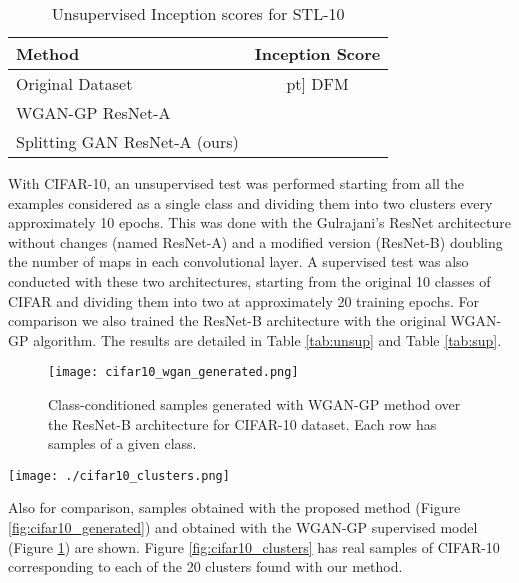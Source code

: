 \documentclass[times,twocolumn]{article}
\begin{document}
\begin{table}
\begin{center}
\caption{Unsupervised Inception scores for STL-10}
\begin{tabular}{lc}
\toprule
Method                                   &   Inception Score \\
\midrule
Original Dataset \cite{WardeFarley2017}  &   \5pt]
DFM \cite{WardeFarley2017}               &   \\
WGAN-GP ResNet-A                         &   \\
Splitting GAN ResNet-A (ours)            &   \\
\bottomrule
\end{tabular}
\end{center}
\label{tab:sup_stl10}
\end{table}

With CIFAR-10, an unsupervised test was performed starting from all the examples considered as a single class and dividing them into two clusters every approximately 10 epochs.  This was done with the Gulrajani's ResNet architecture without changes (named ResNet-A) and a modified version (ResNet-B) doubling the number of maps in each convolutional layer. A supervised test was also conducted with these two architectures, starting from the original 10 classes of CIFAR and dividing them into two at approximately 20 training epochs. For comparison we also trained the ResNet-B architecture with the original WGAN-GP algorithm. The results are detailed in Table \ref{tab:unsup} and Table \ref{tab:sup}. 



\begin{figure}
\centering
\texttt{[image: cifar10\_wgan\_generated.png]}
\caption{Class-conditioned samples generated with WGAN-GP method \cite{Gulrajani2017} over the ResNet-B architecture for CIFAR-10 dataset. Each row has samples of a given class.}
\label{fig:cifar10_wgan_generated}
\end{figure}


\begin{figure*}
 \centering
 \texttt{[image: ./cifar10\_clusters.png]}
 \caption{Real CIFAR-10 samples corresponding to the 20 clusters found by our method. Each line is divided in the same way as in Figure \ref{fig:cifar10_generated}.}
 \label{fig:cifar10_clusters}
\end{figure*}

Also for comparison, samples obtained with the proposed method (Figure \ref{fig:cifar10_generated}) and obtained with the WGAN-GP supervised model (Figure \ref{fig:cifar10_wgan_generated}) are shown. Figure \ref{fig:cifar10_clusters} has real samples of CIFAR-10 corresponding to each of the 20 clusters found with our method.
\end{document}
